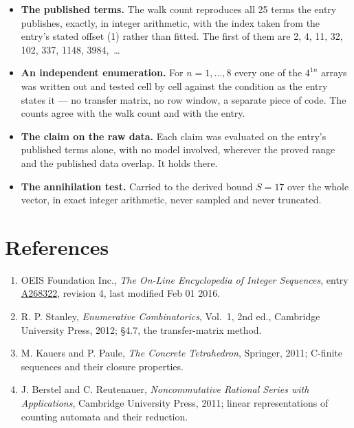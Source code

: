 \documentclass[11pt]{article}
\theoremstyle{definition}
\begin{document}
\begin{itemize}

\item {\bfseries The published terms.} The walk count reproduces all 25 terms the entry publishes, exactly, in integer arithmetic, with the index taken from the entry's stated offset (1) rather than fitted. The first of them are 2, 4, 11, 32, 102, 337, 1148, 3984,~\dots

\item {\bfseries An independent enumeration.} For $n = 1,\dots,8$ every one of the $4^{1n}$ arrays was written out and tested cell by cell against the condition as the entry states it --- no transfer matrix, no row window, a separate piece of code. The counts agree with the walk count and with the entry.

\item {\bfseries The claim on the raw data.} Each claim was evaluated on the entry's published terms alone, with no model involved, wherever the proved range and the published data overlap. It holds there.

\item {\bfseries The annihilation test.} Carried to the derived bound $S = 17$ over the whole vector, in exact integer arithmetic, never sampled and never truncated.

\end{itemize}

\section{References}

\begin{enumerate}

\item OEIS Foundation Inc., \emph{The On-Line Encyclopedia of Integer Sequences}, entry \href{https://oeis.org/A268322}{A268322}, revision 4, last modified Feb 01 2016.

\item R. P. Stanley, \emph{Enumerative Combinatorics}, Vol.~1, 2nd ed., Cambridge University Press, 2012; \S4.7, the transfer-matrix method.

\item M. Kauers and P. Paule, \emph{The Concrete Tetrahedron}, Springer, 2011; C-finite sequences and their closure properties.

\item J. Berstel and C. Reutenauer, \emph{Noncommutative Rational Series with Applications}, Cambridge University Press, 2011; linear representations of counting automata and their reduction.

\end{enumerate}
\end{document}
